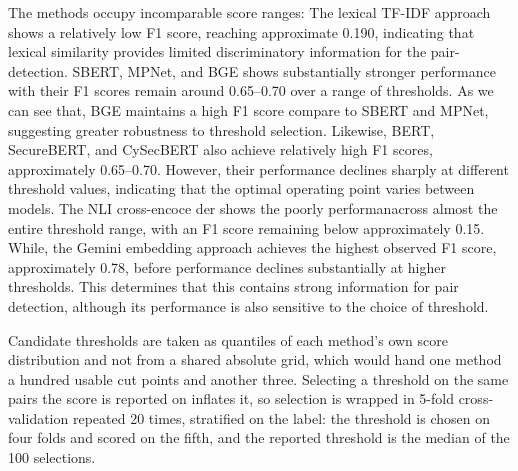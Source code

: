 The methods occupy incomparable score ranges:
The lexical TF-IDF approach shows a relatively low F1 score, reaching approximate 0.190, indicating that lexical similarity provides limited discriminatory information for the pair-detection. 
SBERT, MPNet, and BGE shows substantially stronger performance with their F1 scores remain around 0.65–0.70 over a range of thresholds. As we can see that, BGE maintains a high F1 score compare to SBERT and MPNet, suggesting greater robustness to threshold selection. 
Likewise, BERT, SecureBERT, and CySecBERT also achieve relatively high F1 scores, approximately 0.65–0.70. However, their performance declines sharply at different threshold values, indicating that the optimal operating point varies between models. 
The NLI cross-encoce der shows the poorly performanacross almost the entire threshold range, with an F1 score remaining below approximately 0.15. 
While, the Gemini embedding approach achieves the highest observed F1 score, approximately 0.78, before performance declines substantially at higher thresholds. This determines that this contains strong information for pair detection, although its performance is also sensitive to the choice of threshold.

Candidate thresholds are taken as quantiles of each method's own score distribution and not from a shared absolute
grid, which would hand one method a hundred usable cut points and another three.
Selecting a threshold on the same pairs the score is reported on inflates it, so
selection is wrapped in 5-fold cross-validation repeated 20 times, stratified on
the label: the threshold is chosen on four folds and scored on the fifth, and the
reported threshold is the median of the 100 selections.



